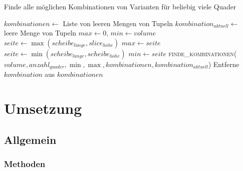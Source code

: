 \documentclass[a4paper,10pt,ngerman]{scrartcl}
\begin{document}
    \begin{algorithm}[H]
        \caption{Finde alle möglichen Kombinationen von Varianten für beliebig viele Quader}
        \label{alg:p}
        \begin{algorithmic}[1]
                \State $kombinationen \gets$ Liste von leeren Mengen von Tupeln
                \State $kombination_{aktuell} \gets$ leere Menge von Tupeln
                \State $max \gets 0$, $min \gets volume$
                    \State $seite \gets \max(scheibe_{l\ddot ange}, slice_{h\ddot ohe})$
                        \State $max \gets seite$
                    \EndIf
                    \State $seite \gets \min(scheibe_{l\ddot ange}, scheibe_{h\ddot ohe})$
                        \State $min \gets seite$
                    \EndIf
                \EndFor
                \State \textsc{finde\_kombinationen}($volume, anzahl_{quader}, \min, \max, kombinationen, kombination_{aktuell}$)
                        \State Entferne $kombination$ aus $kombinationen$
                    \EndIf
                \EndFor
                \State {}\label{alg:algorithm}
            \EndFunction
        \end{algorithmic}
    \end{algorithm}

    \newpage
    \section{Umsetzung}\label{sec:umsetzung}

    \subsection{Allgemein}\label{subsec:allgemein2}



    \subsubsection{Methoden}\label{subsubsec:methoden}
\end{document}
